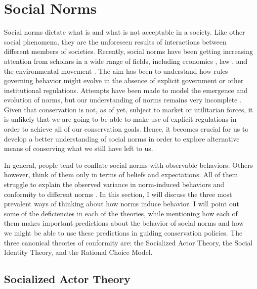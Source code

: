 \documentclass[rutwik_proposal.tex]{subfiles}
\begin{document}
\section{Social Norms}\label{sec:norms}

Social norms dictate what is and what is not acceptable in a society. Like other social phenomena, they are the unforeseen results of interactions between different members of societies. Recently, social norms have been getting increasing attention from scholars in a wide range of fields, including economics \cite{Young98}, law \cite{Ellickson91, Posner00}, and the environmental movement \cite{Kinzig13}. The aim has been to understand how rules governing behavior might evolve in the absence of explicit government or other institutional regulations. Attempts have been made to model the emergence and evolution of norms, but our understanding of norms remains very incomplete \cite{Levin11}. Given that conservation is not, as of yet, subject to market or utilitarian forces, it is unlikely that we are going to be able to make use of explicit regulations in order to achieve all of our conservation goals. Hence, it becomes crucial for us to develop a better understanding of social norms in order to explore alternative means of conserving what we still have left to us.

In general, people tend to conflate social norms with observable behaviors. Others however, think of them only in terms of beliefs and expectations. All of them struggle to explain the observed variance in norm-induced behaviors and conformity to different norms \cite{Bicchieri14}. In this section, I will discuss the three most prevalent ways of thinking about how norms induce behavior. I will point out some of the deficiencies in each of the theories, while mentioning how each of them makes important predictions about the behavior of social norms and how we might be able to use these predictions in guiding conservation policies. The three canonical theories of conformity are: the Socialized Actor Theory, the Social Identity Theory, and the Rational Choice Model.

\subsection{Socialized Actor Theory}\label{subsec:socialization}
\end{document}
